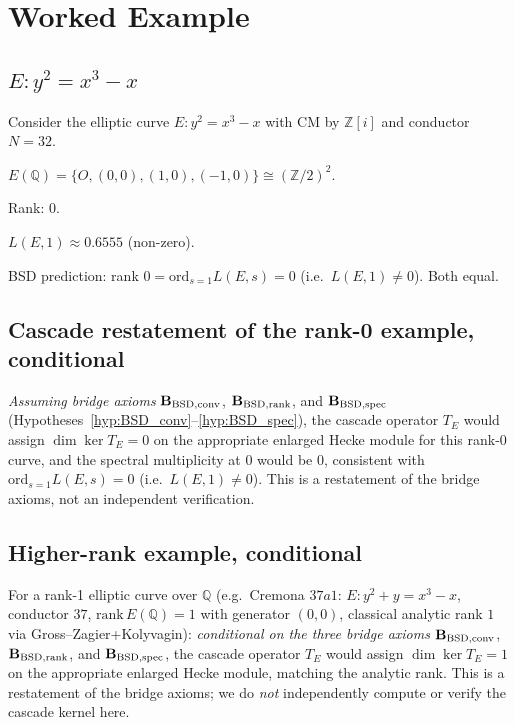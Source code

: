 \documentclass[11pt, a4paper]{amsart}
\theoremstyle{definition}
\newcommand{\Q}{\mathbb{Q}}
\newcommand{\Z}{\mathbb{Z}}
\begin{document}
\section{Worked Example}

\subsection{$E: y^2 = x^3 - x$}

Consider the elliptic curve $E: y^2 = x^3 - x$ with CM by $\Z[i]$ and
conductor $N = 32$.

$E(\Q) = \{O, (0, 0), (1, 0), (-1, 0)\} \cong (\Z/2)^2$.

Rank: 0.

$L(E, 1) \approx 0.6555$ (non-zero).

BSD prediction: rank $0 = \mathrm{ord}_{s=1} L(E, s) = 0$ (i.e.\ $L(E,1) \neq 0$). Both equal.

\subsection{Cascade restatement of the rank-0 example, conditional}

\emph{Assuming bridge axioms} $\mathbf{B_{\rm BSD,conv}}$,
$\mathbf{B_{\rm BSD,rank}}$, and $\mathbf{B_{\rm BSD,spec}}$
(Hypotheses~\ref{hyp:BSD_conv}--\ref{hyp:BSD_spec}), the cascade
operator $T_E$ would assign $\dim\ker T_E = 0$ on the appropriate
enlarged Hecke module for this rank-0 curve, and the spectral
multiplicity at $0$ would be $0$, consistent with
$\mathrm{ord}_{s=1} L(E,s) = 0$ (i.e.\ $L(E,1) \neq 0$). This is a
restatement of the bridge axioms, not an independent verification.

\subsection{Higher-rank example, conditional}

For a rank-1 elliptic curve over $\Q$ (e.g.\ Cremona $37a1$:
$E:y^2 + y = x^3 - x$, conductor $37$, $\mathrm{rank}\,E(\Q) = 1$
with generator $(0,0)$, classical analytic rank $1$ via
Gross--Zagier+Kolyvagin): \emph{conditional on the three bridge
axioms} $\mathbf{B_{\rm BSD,conv}}$, $\mathbf{B_{\rm BSD,rank}}$,
and $\mathbf{B_{\rm BSD,spec}}$, the cascade operator $T_E$ would
assign $\dim\ker T_E = 1$ on the appropriate enlarged Hecke module,
matching the analytic rank. This is a restatement of the bridge
axioms; we do \emph{not} independently compute or verify the
cascade kernel here.
\end{document}
